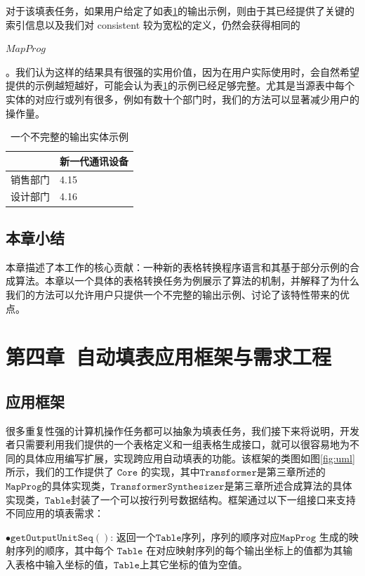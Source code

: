 \documentclass[design, pageheader]{njubachelor}
\begin{document}
对于该填表任务，如果用户给定了如表\ref{table:example_target_partial_example}的输出示例，则由于其已经提供了关键的索引信息以及我们对 consistent 较为宽松的定义，仍然会获得相同的 \begin{ttmath}$MapProg$\end{ttmath}。我们认为这样的结果具有很强的实用价值，因为在用户实际使用时，会自然希望提供的示例越短越好，可能会认为表\ref{table:example_target_partial_example}的示例已经足够完整。尤其是当源表中每个实体的对应行或列有很多，例如有数十个部门时，我们的方法可以显著减少用户的操作量。
\begin{table}[!htbp] 
    \centering   
    \begin{tabular}{|l|l|}
    \hline
     & 新一代通讯设备 \\ \hline
    销售部门   & 4.15      \\ \hline
    设计部门   & 4.16   \\ \hline
    \end{tabular}
    \caption{一个不完整的输出实体示例}
    \label{table:example_target_partial_example}
\end{table}

\subsection{本章小结}
本章描述了本工作的核心贡献：一种新的表格转换程序语言和其基于部分示例的合成算法。本章以一个具体的表格转换任务为例展示了算法的机制，并解释了为什么我们的方法可以允许用户只提供一个不完整的输出示例、讨论了该特性带来的优点。

\section{第四章~自动填表应用框架与需求工程}
\subsection{应用框架}
很多重复性强的计算机操作任务都可以抽象为填表任务，我们接下来将说明，开发者只需要利用我们提供的一个表格定义和一组表格生成接口，就可以很容易地为不同的具体应用编写扩展，实现跨应用自动填表的功能。该框架的类图如图\ref{fig:uml}所示，我们的工作提供了 $\mathtt{Core}$ 的实现，其中$\mathtt{Transformer}$是第三章所述的$\mathtt{MapProg}$的具体实现类，$\mathtt{TransformerSynthesizer}$是第三章所述合成算法的具体实现类，$\mathtt{Table}$封装了一个可以按行列号数据结构。框架通过以下一组接口来支持不同应用的填表需求：

$\bullet \mathtt{getOutputUnitSeq()}$: 返回一个$\mathtt{Table}$序列，序列的顺序对应$\mathtt{MapProg}$ 生成的映射序列的顺序，其中每个 $\mathtt{Table}$ 在对应映射序列的每个输出坐标上的值都为其输入表格中输入坐标的值，$\mathtt{Table}$上其它坐标的值为空值。 
\end{document}
